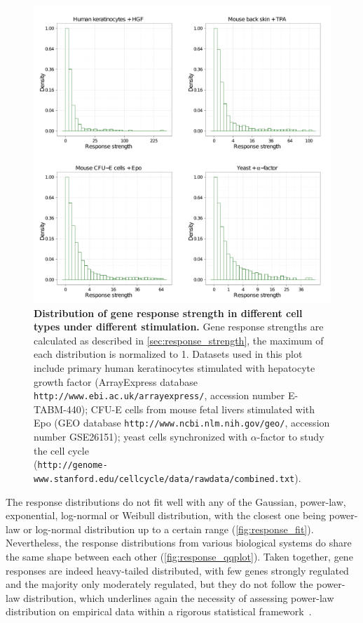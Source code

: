 \begin{figure}[!ht]
\begin{center}
\includegraphics[width=\textwidth]{network/fig/response_all.pdf}
\end{center}
\caption[Heavy-tail distribution of gene response strength]{
{\bf Distribution of gene response strength in different
cell types under different stimulation.}
Gene response strengths are calculated as described in 
\ref{sec:response_strength}, the maximum of each distribution
is normalized to 1. Datasets used in this plot include 
primary human keratinocytes 
stimulated with hepatocyte growth factor (ArrayExpress database 
\texttt{http://www.ebi.ac.uk/arrayexpress/},
accession number E-TABM-440); CFU-E cells from mouse fetal livers stimulated
with Epo (GEO database \texttt{http://www.ncbi.nlm.nih.gov/geo/}, accession
number GSE26151); yeast cells synchronized with 
$\alpha$-factor to study the cell cycle
\\(\texttt{http://genome-www.stanford.edu/cellcycle/data/rawdata/combined.txt}).
}
\label{fig:response_strength}
\end{figure}

The response distributions do not fit well with any of the 
Gaussian, power-law, exponential, log-normal or Weibull distribution, with the closest one being power-law or log-normal
distribution up to a certain range (\ref{fig:response_fit}). 
Nevertheless, the response distributions from various 
biological systems do share the same shape between each 
other (\ref{fig:response_qqplot}). Taken together, gene
responses are indeed heavy-tailed distributed, with few
genes strongly regulated and the majority only moderately
regulated, but they do not follow the power-law distribution,
which underlines again the necessity of assessing power-law
distribution on empirical data within a rigorous statistical
framework~\citep{Clauset2009}.


